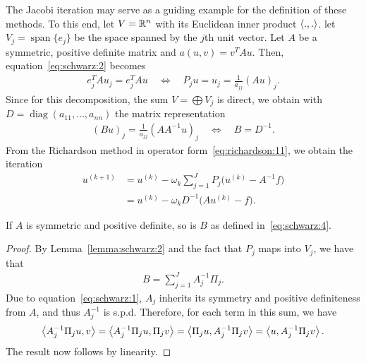 \begin{example}
  The Jacobi iteration may serve as a guiding example for the
  definition of these methods. To this end, let $V = \mathbb R^n$ with its
  Euclidean inner product $\scal(.,.)$. let $V_j =
  \operatorname{span}\{e_j\}$ be the space spanned by the $j$th unit
  vector. Let $A$ be a symmetric, positive definite matrix and $a(u,v)
  = v^T A u$. Then, equation~\eqref{eq:schwarz:2} becomes
  \begin{gather*}
    e_j^T A u_j = e_j^T A u
    \quad \Leftrightarrow \quad
    P_j u = u_j = \frac1{a_{jj}}(A u)_j.
  \end{gather*}
  Since for this decomposition, the sum $V=\bigoplus V_j$ is direct,
  we obtain with $D=\operatorname{diag}(a_{11},\dots,a_{nn})$ the
  matrix representation
  \begin{gather*}
    (B u)_j = \frac1{a_{jj}}(A A^{-1} u)_j
    \quad \Leftrightarrow \quad
    B = D^{-1}.
  \end{gather*}
  From the Richardson method in operator
  form~\eqref{eq:richardson:11}, we obtain the iteration
  \begin{align*}
    u^{(k+1)} &= u^{(k)} - \omega_k \sum_{j=1}^J P_j \bigl(u^{(k)} -
    A^{-1}f\bigr)\\
    &= u^{(k)} - \omega_k D^{-1} \bigl(A u^{(k)} - f\bigr).
  \end{align*}
\end{example}

\begin{lemma}
  \label{lemma:schwarz:3}
  If $A$ is symmetric and positive definite, so is $B$ as defined
  in~\eqref{eq:schwarz:4}.
\end{lemma}

\begin{proof}
  By Lemma~\ref{lemma:schwarz:2} and the fact that $P_j$ maps into $V_j$, we have that
  \begin{gather}
    \label{eq:schwarz:16}
    B = \sum_{j=1}^J A_j^{-1} \Pi_j.
  \end{gather}
  Due to equation~\eqref{eq:schwarz:1}, $A_j$ inherits its symmetry
  and positive definiteness from $A$, and thus $A_j^{-1}$ is s.p.d.
  Therefore, for each term in this sum, we have
  \begin{gather*}
    \scal(A_j^{-1} \Pi_j u, v)
    = \scal(A_j^{-1} \Pi_j u, \Pi_j v)
    = \scal( \Pi_j u, A_j^{-1}\Pi_j v)
    = \scal(u, A_j^{-1}\Pi_j v).
  \end{gather*}
  The result now follows by linearity.
\end{proof}

